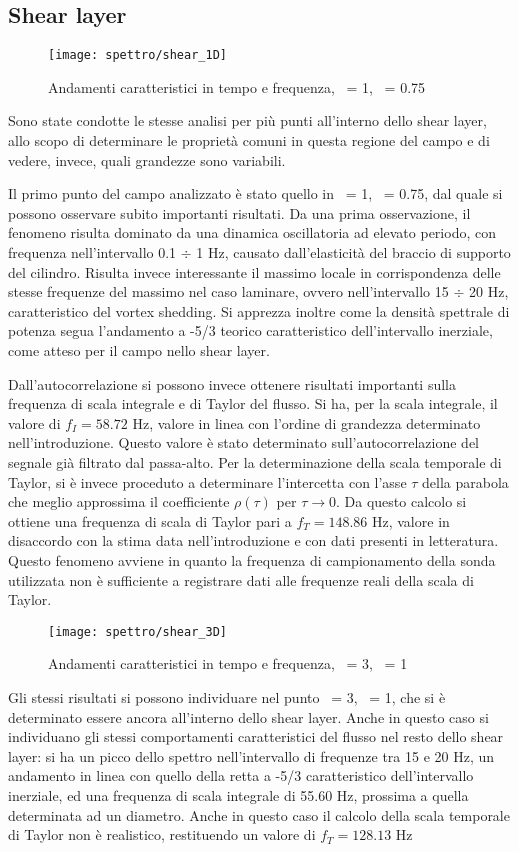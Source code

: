 \documentclass{article} %
\newcommand{\xd}{\nicefrac{\textrm{x}}{\textrm{D}}\ }
\newcommand{\yd}{\nicefrac{\textrm{y}}{\textrm{D}}\ }
\begin{document}
\subsection{Shear layer}
\begin{figure}[h]
	\texttt{[image: spettro/shear\_1D]}
	\caption{Andamenti caratteristici in tempo e frequenza, \xd = 1, \yd = 0.75}
\end{figure}
Sono state condotte le stesse analisi per più punti all'interno dello shear layer, allo scopo di determinare le proprietà comuni in questa regione del campo e di vedere, invece, quali grandezze sono variabili.\par
Il primo punto del campo analizzato è stato quello in \xd = 1, \yd = 0.75, dal quale si possono osservare subito importanti risultati. Da una prima osservazione, il fenomeno risulta dominato da una dinamica oscillatoria ad elevato periodo, con frequenza nell'intervallo 0.1 $\div$ 1 Hz, causato dall'elasticità del braccio di supporto del cilindro. Risulta invece interessante il massimo locale in corrispondenza delle stesse frequenze del massimo nel caso laminare, ovvero nell'intervallo 15 $\div$ 20 Hz, caratteristico del vortex shedding. Si apprezza inoltre come la densità spettrale di potenza segua l'andamento a -5/3 teorico caratteristico dell'intervallo inerziale, come atteso per il campo nello shear layer.\par
Dall'autocorrelazione si possono invece ottenere risultati importanti sulla frequenza di scala integrale e di Taylor del flusso. Si ha, per la scala integrale, il valore di $f_I = 58.72$ Hz, valore in linea con l'ordine di grandezza determinato nell'introduzione. Questo valore è stato determinato sull'autocorrelazione del segnale già filtrato dal passa-alto. Per la determinazione della scala temporale di Taylor, si è invece proceduto a determinare l'intercetta con l'asse $\tau$ della parabola che meglio approssima il coefficiente $\rho(\tau)$ per $\tau \to 0$. Da questo calcolo si ottiene una frequenza di scala di Taylor pari a $f_T = 148.86$ Hz, valore in disaccordo con la stima data nell'introduzione e con dati presenti in letteratura. Questo fenomeno avviene in quanto la frequenza di campionamento della sonda utilizzata non è sufficiente a registrare dati alle frequenze reali della scala di Taylor. \par\bigskip
\begin{figure}[h]
	\texttt{[image: spettro/shear\_3D]}
	\caption{Andamenti caratteristici in tempo e frequenza, \xd = 3, \yd = 1}
\end{figure}
Gli stessi risultati si possono individuare nel punto \xd = 3, \yd = 1, che si è determinato essere ancora all'interno dello shear layer. Anche in questo caso si individuano gli stessi comportamenti caratteristici del flusso nel resto dello shear layer: si ha un picco dello spettro nell'intervallo di frequenze tra 15 e 20 Hz, un andamento in linea con quello della retta a -5/3 caratteristico dell'intervallo inerziale, ed una frequenza di scala integrale di 55.60 Hz, prossima a quella determinata ad un diametro. Anche in questo caso il calcolo della scala temporale di Taylor non è realistico, restituendo un valore di $f_T = 128.13$ Hz\par
\end{document}
